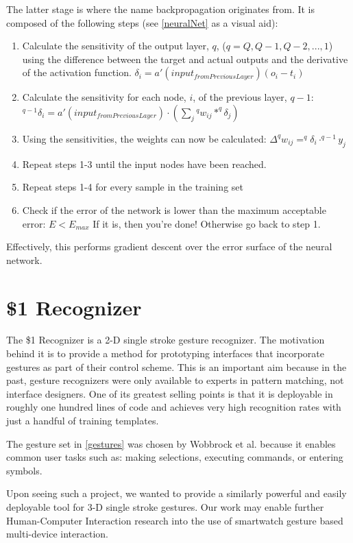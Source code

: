 \documentclass{report}
\begin{document}
The latter stage is where the name backpropagation originates from. It is composed of the following steps (see \ref{neuralNet} as a visual aid):
\begin{enumerate}
\item Calculate the sensitivity of the output layer, $q$, ($q = Q, Q-1, Q-2,...,1$) using the difference between the target and actual outputs and the derivative of the activation function. $\delta_i = \mathit{a'}(\mathit{input_{fromPreviousLayer}})(o_i - t_i)$
\item Calculate the sensitivity for each node, $i$, of the previous layer, $q-1$: $^{q-1}\delta_i =  \mathit{a'}(\mathit{input_{fromPreviousLayer}}) \cdot  (\sum\limits_{j} {^{q}w_{ij}* ^{q}\delta_j})$
\item Using the sensitivities, the weights can now be calculated: $\Delta^{q}w_{ij} = ^{q}\delta_i \cdot ^{q-1}y_j$
\item Repeat steps 1-3 until the input nodes have been reached.
\item Repeat steps 1-4 for every sample in the training set
\item Check if the error of the network is lower than the maximum acceptable error: $E < E_{max}$ If it is, then you're done! Otherwise go back to step 1.
\end{enumerate}

Effectively, this performs gradient descent over the error surface of the neural network. \cite{Backprop}

\section{\$1 Recognizer}
The \$1 Recognizer is a 2-D single stroke gesture recognizer. The motivation behind it is to provide a method for prototyping interfaces that incorporate gestures as part of their control scheme. This is an important aim because in the past, gesture recognizers were only available to experts in pattern matching, not interface designers. One of its greatest selling points is that it is deployable in roughly one hundred lines of code and achieves very high recognition rates with just a handful of training templates.

The gesture set in \ref{gestures} was chosen by Wobbrock et al. because it enables common user tasks such as: making selections, executing commands, or entering symbols. \cite{Wobbrock}

Upon seeing such a project, we wanted to provide a similarly powerful and easily deployable tool for 3-D single stroke gestures. Our work may enable further Human-Computer Interaction research into the use of smartwatch gesture based multi-device interaction.
\end{document}
